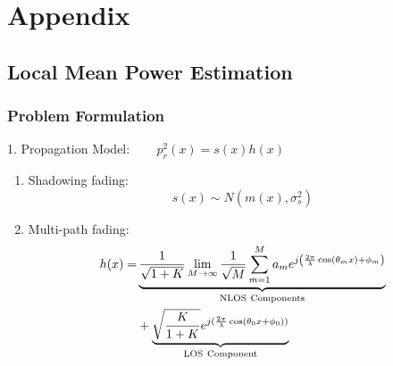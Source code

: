 \section*{Appendix}

\subsection*{Local Mean Power Estimation}

\begin{frame}
\frametitle{Problem Formulation}
\begin{block}{1. Propagation Model: ~~~ $p_{r}^{2}(x) = s(x)h(x)$}
\begin{enumerate}
  \item Shadowing fading:
  \begin{equation}
  s(x) \sim N\left( m(x),\sigma_s^2 \right)
  \end{equation}
  \item Multi-path fading:
  \begin{equation}
  \begin{split}
  h(x)=&\underbrace{\frac{1}{\sqrt{1+K}}\lim_{M \to \infty}\frac{1}{\sqrt M}\sum_{m=1}^{M}a_{m}e^{j\left(\frac{2\pi}{\lambda}\cos(\theta_{m}x)+\phi_m\right)}}_{\rm NLOS~Components}\\
  &+\underbrace{\sqrt{\frac{K}{1+K}}e^{j(\frac{2\pi}{\lambda}\cos(\theta_{0}x+ \phi_0))}}_{\rm LOS~Component}
  \end{split}
  \label{rician}
  \end{equation}
\end{enumerate}
\end{block}
\hyperlink{sect:qa}{}
\end{frame}
